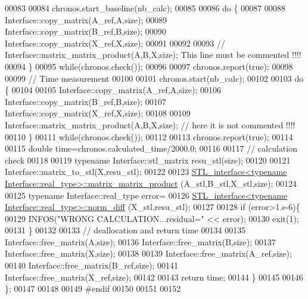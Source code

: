 \begin{DoxyCode}
00083 
00084     chronos.start\_baseline(nb\_calc);
00085 
00086     \textcolor{keywordflow}{do} \{
00087 
00088       Interface::copy\_matrix(A\_ref,A,size);
00089       Interface::copy\_matrix(B\_ref,B,size);
00090       Interface::copy\_matrix(X\_ref,X,size);
00091 
00092 
00093       \textcolor{comment}{//      Interface::matrix\_matrix\_product(A,B,X,size); This line must be commented !!!!}
00094     \}
00095     \textcolor{keywordflow}{while}(chronos.check());
00096 
00097     chronos.report(\textcolor{keyword}{true});
00098 
00099     \textcolor{comment}{// Time measurement}
00100 
00101     chronos.start(nb\_calc);
00102 
00103     \textcolor{keywordflow}{do} \{
00104 
00105       Interface::copy\_matrix(A\_ref,A,size);
00106       Interface::copy\_matrix(B\_ref,B,size);
00107       Interface::copy\_matrix(X\_ref,X,size);
00108 
00109       Interface::matrix\_matrix\_product(A,B,X,size); \textcolor{comment}{// here it is not commented !!!!}
00110     \}
00111     \textcolor{keywordflow}{while}(chronos.check());
00112 
00113     chronos.report(\textcolor{keyword}{true});
00114 
00115     \textcolor{keywordtype}{double} time=chronos.calculated\_time/2000.0;
00116 
00117     \textcolor{comment}{// calculation check}
00118 
00119     \textcolor{keyword}{typename} Interface::stl\_matrix resu\_stl(size);
00120 
00121     Interface::matrix\_to\_stl(X,resu\_stl);
00122 
00123     \hyperlink{class_s_t_l__interface}{STL\_interface<typename Interface::real\_type>::matrix\_matrix\_product}
      (A\_stl,B\_stl,X\_stl,size);
00124 
00125     \textcolor{keyword}{typename} Interface::real\_type error=
00126       \hyperlink{class_s_t_l__interface}{STL\_interface<typename Interface::real\_type>::norm\_diff}
      (X\_stl,resu\_stl);
00127 
00128     \textcolor{keywordflow}{if} (error>1.e-6)\{
00129       INFOS(\textcolor{stringliteral}{"WRONG CALCULATION...residual="} << error);
00130       exit(1);
00131     \}
00132 
00133     \textcolor{comment}{// deallocation and return time}
00134 
00135     Interface::free\_matrix(A,size);
00136     Interface::free\_matrix(B,size);
00137     Interface::free\_matrix(X,size);
00138 
00139     Interface::free\_matrix(A\_ref,size);
00140     Interface::free\_matrix(B\_ref,size);
00141     Interface::free\_matrix(X\_ref,size);
00142 
00143     \textcolor{keywordflow}{return} time;
00144   \}
00145 
00146 \};
00147 
00148 
00149 \textcolor{preprocessor}{#endif}
00150 
00151 
00152 
\end{DoxyCode}
